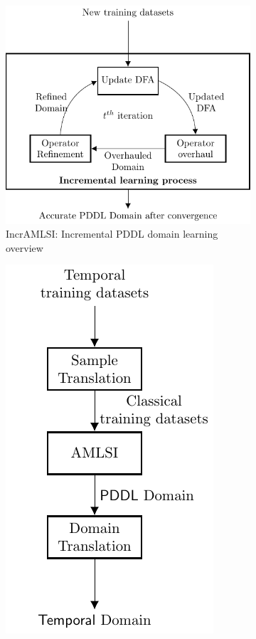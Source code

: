 \begin{figure}
\begin{subfigure}[b]{.4\linewidth}
        \includegraphics[width=.9\linewidth]{pics/out/incremental_amlsi.pdf}
        \caption{IncrAMLSI: Incremental {\sf PDDL} domain learning overview}
        \label{fig:contributions:incremental}
    \end{subfigure}
    \begin{subfigure}[b]{0.2\linewidth}
        \centering
        \includegraphics[width=.9\linewidth]{pics/out/temporal_amlsi.pdf}

\end{subfigure}
\end{figure}
